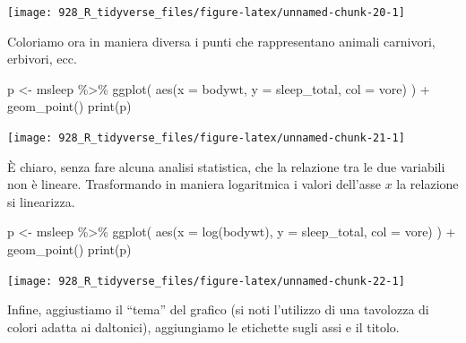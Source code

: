 \documentclass[
  10pt,
  italian,
  a4paper,
  extrafontsizes,onecolumn,openright
  ]{memoir}
\newenvironment{Shaded}{\begin{snugshade}}{\end{snugshade}}
\newcommand{\AttributeTok}[1]{\textcolor[rgb]{0.77,0.63,0.00}{#1}}
\newcommand{\FunctionTok}[1]{\textcolor[rgb]{0.00,0.00,0.00}{#1}}
\newcommand{\NormalTok}[1]{#1}
\newcommand{\OtherTok}[1]{\textcolor[rgb]{0.56,0.35,0.01}{#1}}
\newcommand{\SpecialCharTok}[1]{\textcolor[rgb]{0.00,0.00,0.00}{#1}}
\begin{document}
\begin{center}\texttt{[image: 928\_R\_tidyverse\_files/figure-latex/unnamed-chunk-20-1]} \end{center}

Coloriamo ora in maniera diversa i punti che rappresentano animali carnivori, erbivori, ecc.

\begin{Shaded}
\begin{Highlighting}[]
\NormalTok{p }\OtherTok{\textless{}{-}}\NormalTok{ msleep }\SpecialCharTok{\%\textgreater{}\%} 
  \FunctionTok{ggplot}\NormalTok{(}
    \FunctionTok{aes}\NormalTok{(}\AttributeTok{x =}\NormalTok{ bodywt, }\AttributeTok{y =}\NormalTok{ sleep\_total, }\AttributeTok{col =}\NormalTok{ vore)}
\NormalTok{  ) }\SpecialCharTok{+}
  \FunctionTok{geom\_point}\NormalTok{()}
\FunctionTok{print}\NormalTok{(p)}
\end{Highlighting}
\end{Shaded}

\begin{center}\texttt{[image: 928\_R\_tidyverse\_files/figure-latex/unnamed-chunk-21-1]} \end{center}

È chiaro, senza fare alcuna analisi statistica, che la relazione tra le due variabili non è lineare. Trasformando in maniera logaritmica i valori dell'asse \(x\) la relazione si linearizza.

\begin{Shaded}
\begin{Highlighting}[]
\NormalTok{p }\OtherTok{\textless{}{-}}\NormalTok{ msleep }\SpecialCharTok{\%\textgreater{}\%} 
  \FunctionTok{ggplot}\NormalTok{(}
    \FunctionTok{aes}\NormalTok{(}\AttributeTok{x =} \FunctionTok{log}\NormalTok{(bodywt), }\AttributeTok{y =}\NormalTok{ sleep\_total, }\AttributeTok{col =}\NormalTok{ vore)}
\NormalTok{  ) }\SpecialCharTok{+}
  \FunctionTok{geom\_point}\NormalTok{()}
\FunctionTok{print}\NormalTok{(p)}
\end{Highlighting}
\end{Shaded}

\begin{center}\texttt{[image: 928\_R\_tidyverse\_files/figure-latex/unnamed-chunk-22-1]} \end{center}

Infine, aggiustiamo il ``tema'' del grafico (si noti l'utilizzo di una tavolozza di colori adatta ai daltonici), aggiungiamo le etichette sugli assi e il titolo.
\end{document}
